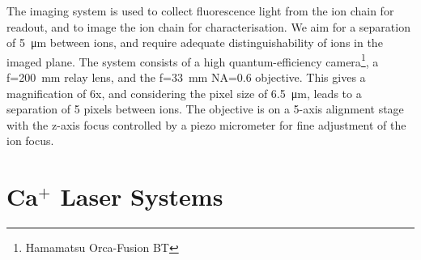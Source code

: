     The imaging system is used to collect fluorescence light from the ion chain
    for readout, and to image the ion chain for characterisation.
    We aim for a separation of 5~\unit{\um} between ions, and require adequate distinguishability of ions in the imaged plane.
    The system
    consists of a high quantum-efficiency camera\footnote{Hamamatsu Orca-Fusion BT}, a f=200~\unit{\mm} relay lens, and the f=33~\unit{\mm} NA=0.6 objective. This gives a magnification of 6x, and considering the pixel size of 6.5~\unit{\um}, leads to a separation of 5 pixels between ions. The objective is on a 5-axis alignment stage with the z-axis focus controlled by a piezo micrometer for fine adjustment of the ion focus.

\section{Ca$^+$ Laser Systems}	
\label{sec:Laser systems}

